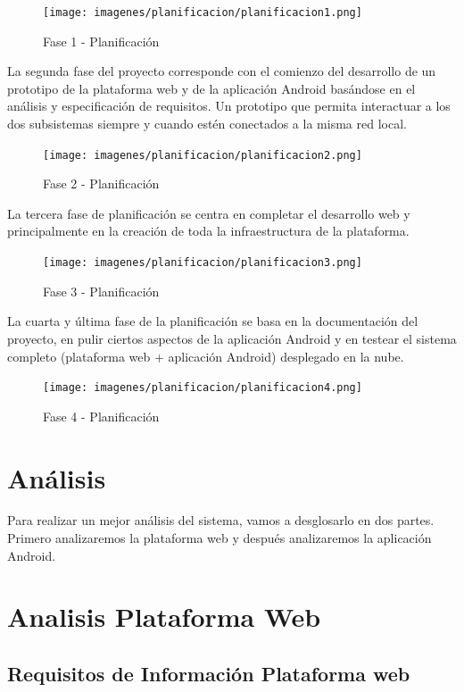 \documentclass[a4paper,11pt]{book}
\begin{document}
\begin{figure}[H] 
\centering 
\texttt{[image: imagenes/planificacion/planificacion1.png]}
\caption{ Fase 1 - Planificación\cite{tomsplanner}  }  
\end{figure}

La segunda fase del proyecto corresponde con el comienzo del desarrollo de un prototipo de la plataforma web y de la aplicación Android basándose en el análisis y especificación de requisitos. Un prototipo que permita interactuar a los dos subsistemas siempre y cuando estén conectados a la misma red local.

\begin{figure}[H] 
\centering 
\texttt{[image: imagenes/planificacion/planificacion2.png]}
\caption{ Fase 2 - Planificación\cite{tomsplanner}  }  
\end{figure}

La tercera fase de planificación se centra en completar el desarrollo web y principalmente en la creación de toda la infraestructura de la plataforma.

\begin{figure}[H] 
\centering 
\texttt{[image: imagenes/planificacion/planificacion3.png]}
\caption{ Fase 3 - Planificación\cite{tomsplanner}  }  
\end{figure}

La cuarta y última fase de la planificación se basa en la documentación del proyecto, en pulir ciertos aspectos de la aplicación Android y en testear el sistema completo (plataforma web + aplicación Android) desplegado en la nube. 

\begin{figure}[H] 
\centering 
\texttt{[image: imagenes/planificacion/planificacion4.png]}
\caption{ Fase 4 - Planificación\cite{tomsplanner}  }  
\end{figure}



\section{Análisis}
Para realizar un mejor análisis del sistema, vamos a desglosarlo en dos partes. Primero analizaremos la plataforma web y después analizaremos la aplicación Android. 

\section{Analisis Plataforma Web}
\subsection{Requisitos de Información Plataforma web}
\end{document}
